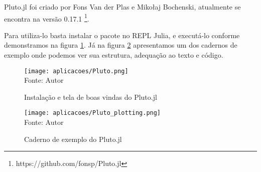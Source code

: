 Pluto.jl foi criado por Fons Van der Plas e Mikołaj Bochenski, atualmente se encontra na versão 0.17.1 \footnote{https://github.com/fonsp/Pluto.jl}.  

Para utiliza-lo basta instalar o pacote no REPL Julia, e executá-lo conforme demonstramos na figura \ref{Pluto}. Já na figura \ref{Pluto_plot} apresentamos um dos cadernos de exemplo onde podemos ver sua estrutura, adequação ao texto e código. 

\begin{figure}[H]
\begin{center}
    \caption{Instalação e tela de boas vindas do Pluto.jl} \label{Pluto}
    \texttt{[image: aplicacoes/Pluto.png]} \\
    {\tiny \sf Fonte: Autor}
\end{center}
\end{figure} 

\begin{figure}[H]
\begin{center}
    \caption{Caderno de exemplo do Pluto.jl} \label{Pluto_plot}
    \texttt{[image: aplicacoes/Pluto\_plotting.png]} \\
    {\tiny \sf Fonte: Autor}
\end{center}
\end{figure} 